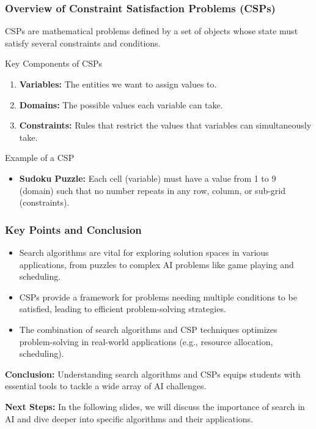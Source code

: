 \documentclass[aspectratio=169]{beamer}
\begin{document}
\begin{frame}[fragile]
    \frametitle{Overview of Constraint Satisfaction Problems (CSPs)}
    CSPs are mathematical problems defined by a set of objects whose state must satisfy several constraints and conditions.
    
    \begin{block}{Key Components of CSPs}
        \begin{enumerate}
            \item \textbf{Variables:} The entities we want to assign values to.
            \item \textbf{Domains:} The possible values each variable can take.
            \item \textbf{Constraints:} Rules that restrict the values that variables can simultaneously take.
        \end{enumerate}
    \end{block}

    \begin{block}{Example of a CSP}
        \begin{itemize}
            \item \textbf{Sudoku Puzzle:} Each cell (variable) must have a value from 1 to 9 (domain) such that no number repeats in any row, column, or sub-grid (constraints).
        \end{itemize}
    \end{block}
\end{frame}

\begin{frame}[fragile]
    \frametitle{Key Points and Conclusion}
    \begin{itemize}
        \item Search algorithms are vital for exploring solution spaces in various applications, from puzzles to complex AI problems like game playing and scheduling.
        \item CSPs provide a framework for problems needing multiple conditions to be satisfied, leading to efficient problem-solving strategies.
        \item The combination of search algorithms and CSP techniques optimizes problem-solving in real-world applications (e.g., resource allocation, scheduling).
    \end{itemize}
    
    \textbf{Conclusion:} Understanding search algorithms and CSPs equips students with essential tools to tackle a wide array of AI challenges.
    
    \textbf{Next Steps:} In the following slides, we will discuss the importance of search in AI and dive deeper into specific algorithms and their applications.
\end{frame}
\end{document}
